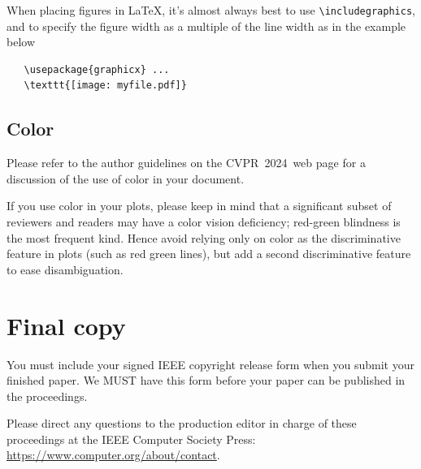 \documentclass[10pt,twocolumn,letterpaper]{article}
\def\confName{CVPR}
\def\confYear{2024}
\begin{document}
When placing figures in \LaTeX, it's almost always best to use \verb+\includegraphics+, and to specify the figure width as a multiple of the line width as in the example below
{\small\begin{verbatim}
   \usepackage{graphicx} ...
   \texttt{[image: myfile.pdf]}
\end{verbatim}
}


\subsection{Color}

Please refer to the author guidelines on the \confName\ \confYear\ web page for a discussion of the use of color in your document.

If you use color in your plots, please keep in mind that a significant subset of reviewers and readers may have a color vision deficiency; red-green blindness is the most frequent kind.
Hence avoid relying only on color as the discriminative feature in plots (such as red \vs green lines), but add a second discriminative feature to ease disambiguation.

\section{Final copy}

You must include your signed IEEE copyright release form when you submit your finished paper.
We MUST have this form before your paper can be published in the proceedings.

Please direct any questions to the production editor in charge of these proceedings at the IEEE Computer Society Press:
\url{https://www.computer.org/about/contact}.


{\small


}
\end{document}

